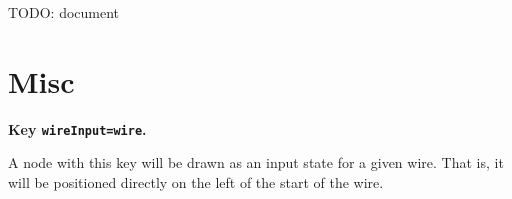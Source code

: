 \documentclass[a4paper]{article}
\newenvironment{key}[2]{%
  \medskip\noindent\textbf{Key \keyanchor{#1}\texttt{#2}.} 
}{%
}
\DeclareRobustCommand\keyanchor[1]{\label{key-#1}\texttt{#1}}
\begin{document}
TODO: document


\begin{example}
\end{example}


\section{Misc}


\begin{key}{wireInput}{=wire}
  A node with this key will be drawn as an input state for a given
  wire.  That is, it will be positioned directly on the left of the
  start of the wire.

\begin{example}
\end{example}
\end{key}
\end{document}
